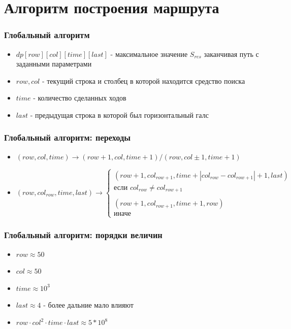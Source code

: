 \documentclass{beamer} %
\theoremstyle{definition} %
\begin{document}
\section{Алгоритм построения маршрута}
\begin{frame}
\frametitle{Глобальный алгоритм}
\begin{itemize}
\item{$dp[row][col][time][last]$ - максимальное значение $S_{res}$ заканчивая путь с заданными параметрами}
\item{$row, col$ - текущий строка и столбец в которой находится средство поиска}
\item{$time$ - количество сделанных ходов}
\item{$last$ - предыдущая строка в которой был горизонтальный галс}

\end{itemize}
\end{frame}

\begin{frame}
\frametitle{Глобальный алгоритм: переходы}
\begin{itemize}
\item{$(row, col, time) \to (row+1, col, time+1)/(row, col \pm 1, time+1)$}
\\
\item{$(row, col_{row}, time, last) \to 
\left\{
\begin{array}{l}
        (row+1, col_{row+1}, time+|col_{row}-col_{row+1}| + 1, last)\\
 \mbox{если } col_{row} \neq col_{row+1}\\
  \\
        (row+1, col_{row+1}, time + 1, row)\\
 \mbox{иначе }
\end{array}
\right.$}
\end{itemize}
\end{frame}

\begin{frame}
\frametitle{Глобальный алгоритм: порядки величин}
\begin{itemize}
\item{$row \approx 50$}
\item{$col \approx 50$}
\item{$time \approx 10^3$}
\item{$last \approx 4$ - более дальние мало влияют}
\item{$row \cdot col^2 \cdot time \cdot last \approx 5*10^8$}
\end{itemize}
\end{frame}
\end{document}
